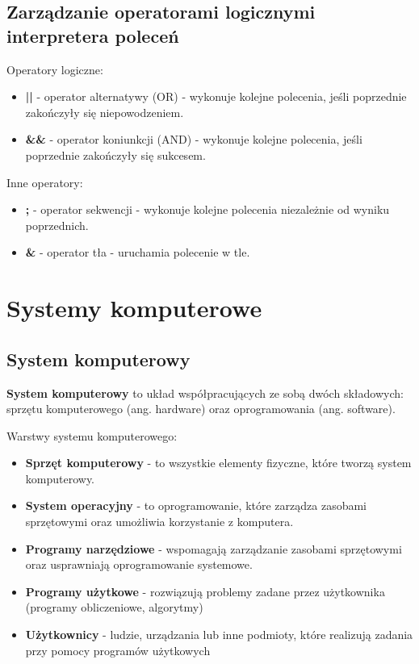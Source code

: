 \documentclass{article}
\begin{document}
\subsection{Zarządzanie operatorami logicznymi interpretera poleceń}
Operatory logiczne:
\begin{itemize}
    \item \textbf{||} - operator alternatywy (OR) - wykonuje kolejne polecenia, jeśli poprzednie zakończyły się niepowodzeniem.
    \item \textbf{\&\&} - operator koniunkcji (AND) - wykonuje kolejne polecenia, jeśli poprzednie zakończyły się sukcesem.
\end{itemize}

Inne operatory:
\begin{itemize}
    \item \textbf{;} - operator sekwencji - wykonuje kolejne polecenia niezależnie od wyniku poprzednich.
    \item \textbf{\&} - operator tła - uruchamia polecenie w tle.
\end{itemize}

\section{Systemy komputerowe}
\subsection{System komputerowy}
\textbf{System komputerowy} to układ współpracujących ze sobą dwóch składowych: sprzętu komputerowego (ang. hardware) oraz oprogramowania (ang. software).

Warstwy systemu komputerowego:
\begin{itemize}
    \item \textbf{Sprzęt komputerowy} - to wszystkie elementy fizyczne, które tworzą system komputerowy.
    \item \textbf{System operacyjny} - to oprogramowanie, które zarządza zasobami sprzętowymi oraz umożliwia korzystanie z komputera.
    \item \textbf{Programy narzędziowe} - wspomagają zarządzanie zasobami sprzętowymi oraz usprawniają oprogramowanie systemowe.
    \item \textbf{Programy użytkowe} - rozwiązują problemy zadane przez użytkownika (programy obliczeniowe, algorytmy)
    \item \textbf{Użytkownicy} - ludzie, urządzania lub inne podmioty, które realizują zadania przy pomocy programów użytkowych
\end{itemize}
\end{document}
